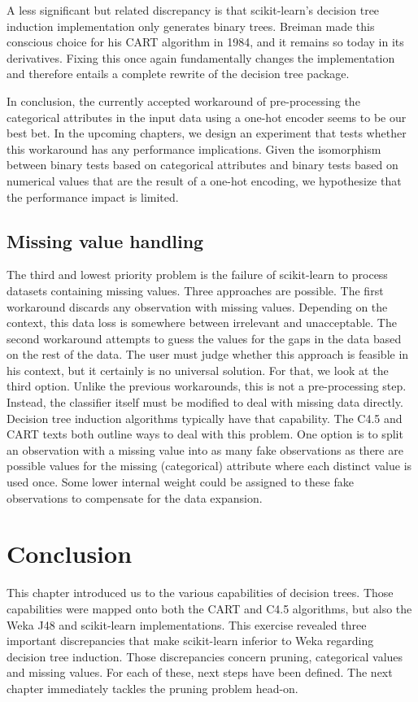 A less significant but related discrepancy is that scikit-learn's decision tree induction implementation only generates binary trees. Breiman made this conscious choice for his CART algorithm in 1984, and it remains so today in its derivatives. Fixing this once again fundamentally changes the implementation and therefore entails a complete rewrite of the decision tree package.

In conclusion, the currently accepted workaround of pre-processing the categorical attributes in the input data using a one-hot encoder seems to be our best bet. In the upcoming chapters, we design an experiment that tests whether this workaround has any performance implications. Given the isomorphism between binary tests based on categorical attributes and binary tests based on numerical values that are the result of a one-hot encoding, we hypothesize that the performance impact is limited.

\subsection{Missing value handling}
The third and lowest priority problem is the failure of scikit-learn to process datasets containing missing values. Three approaches are possible. The first workaround discards any observation with missing values. Depending on the context, this data loss is somewhere between irrelevant and unacceptable. The second workaround attempts to guess the values for the gaps in the data based on the rest of the data. The user must judge whether this approach is feasible in his context, but it certainly is no universal solution. For that, we look at the third option. Unlike the previous workarounds, this is not a pre-processing step. Instead, the classifier itself must be modified to deal with missing data directly. Decision tree induction algorithms typically have that capability. The C4.5 and CART texts both outline ways to deal with this problem. One option is to split an observation with a missing value into as many fake observations as there are possible values for the missing (categorical) attribute where each distinct value is used once. Some lower internal weight could be assigned to these fake observations to compensate for the data expansion.

\section{Conclusion}
This chapter introduced us to the various capabilities of decision trees. Those capabilities were mapped onto both the CART and C4.5 algorithms, but also the Weka J48 and scikit-learn implementations. This exercise revealed three important discrepancies that make scikit-learn inferior to Weka regarding decision tree induction. Those discrepancies concern pruning, categorical values and missing values. For each of these, next steps have been defined. The next chapter immediately tackles the pruning problem head-on.
